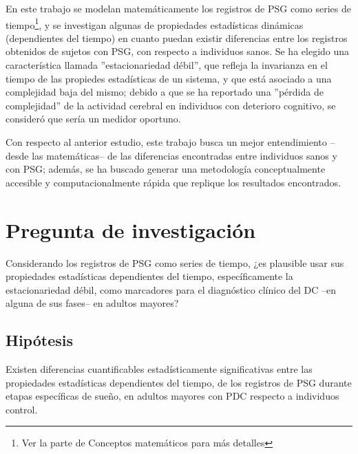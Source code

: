 En este trabajo se modelan matem\'aticamente los registros de PSG como series de 
tiempo\footnote{Ver la parte de Conceptos matem\'aticos para m\'as detalles}, y se
investigan algunas de propiedades estad\'isticas din\'amicas (dependientes del tiempo)
en cuanto puedan existir diferencias entre los registros obtenidos de sujetos con PSG,
con respecto a individuos sanos. Se ha elegido una caracter\'istica
llamada ''estacionariedad d\'ebil'', que refleja la invarianza en el tiempo de las propiedes
estad\'isticas de un sistema, y que est\'a asociado a una complejidad baja del mismo; 
debido a que se ha reportado una ''p\'erdida de complejidad'' de la actividad cerebral
en individuos con deterioro cognitivo, se consider\'o que ser\'ia un medidor oportuno. 

Con respecto al anterior estudio, este trabajo busca un mejor
entendimiento --desde las matem\'aticas-- de las diferencias encontradas entre 
individuos sanos y con PSG; adem\'as, se ha buscado generar una metodolog\'ia 
conceptualmente accesible y computacionalmente r\'apida que replique los resultados encontrados.


\section{Pregunta de investigaci\'on}

Considerando los registros de PSG como series de tiempo,
¿es plausible usar sus propiedades estad\'isticas dependientes del tiempo, espec\'ificamente
la estacionariedad d\'ebil,
como marcadores para el diagn\'ostico cl\'inico del DC --en alguna de 
sus fases-- en adultos mayores?


\subsection{Hip\'otesis}

Existen diferencias cuantificables estad\'isticamente significativas entre las propiedades
estad\'isticas dependientes del tiempo, de los registros de PSG
durante etapas espec\'ificas de sue\~no, en adultos
mayores con PDC respecto a individuos control.


